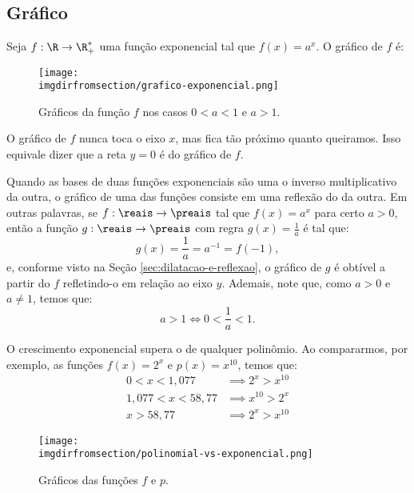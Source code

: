 \subsection{Gráfico}

\begin{example}
    Seja $f: \R \to \R_+^*$ uma função exponencial tal que $f(x) =
a^x$. O gráfico de $f$ é:

\begin{figure}[H]
    \centering
    \texttt{[image: \\imgdirfromsection/grafico-exponencial.png]}
    \caption{Gráficos da função $f$ nos casos $0<a<1$ e $a>1$.}
    \label{img:grafico-exponencial}
\end{figure}

O gráfico de $f$ nunca toca o eixo $x$, mas fica tão próximo quanto
queiramos. Isso equivale dizer que a reta $y=0$ é  do
gráfico de $f$.
\end{example}

\begin{remark}
    Quando as bases de duas funções exponenciais são uma o inverso multiplicativo da outra, o gráfico de uma 
    das funções consiste em uma reflexão do da outra. Em outras palavras, se $f:\reais \to \preais$
    tal que $f(x) = a^x $ para certo $a > 0$, então a função $g:\reais \to \preais$ com regra 
    $g(x) = \frac 1 a$ é tal que:
    \[
        g(x) = \frac 1 a = a^{-1} = f(-1),    
    \]
    e, conforme visto na Seção \ref{sec:dilatacao-e-reflexao}, o gráfico de $g$ é obtível a partir do $f$ refletindo-o em relação ao eixo
    $y$. Ademais, note que, como $a > 0$ e $a \ne 1$, temos que:
    $$a > 1 \iff 0 < \frac{1}{a} < 1.$$
\end{remark}

\begin{example}
    O crescimento exponencial supera o de qualquer polinômio. Ao compararmos, por exemplo, as funções $f(x) = 2^x$ e $p(x)=x^{10}$, temos que:
    \begin{align*}
        0<x<1{,}077 & \implies  2^x > x^{10} \\
        1{,}077 < x < 58{,}77 & \implies  x^{10} > 2^x \\
        x>58{,}77 & \implies  2^x > x^{10}
    \end{align*}
\end{example}

\begin{figure}[H]
    \centering
    \texttt{[image: \\imgdirfromsection/polinomial-vs-exponencial.png]}
    \caption{Gráficos das funções $f$ e $p$.}
    \label{img:polinomial-vs-exponencial}
\end{figure}


